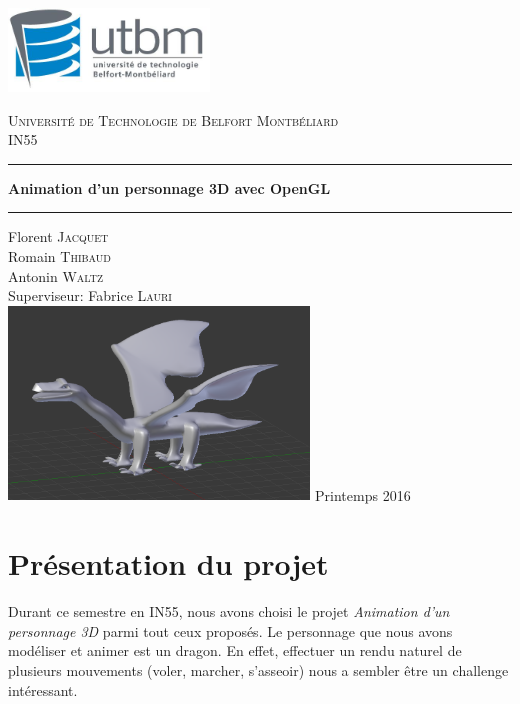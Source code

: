 \documentclass[a4paper]{report}
\begin{document}
\begin{titlepage}
    \includegraphics[width=0.4\textwidth]{logo_utbm.png}
    \begin{center}
        \textsc{\LARGE Université de Technologie de Belfort Montbéliard}\\[1cm]
        \textsc{\Large IN55}\\
        \rule{\linewidth}{0.5mm}
        { \huge \bfseries Animation d'un personnage 3D avec OpenGL\\[0.4cm] }
        \rule{\linewidth}{0.5mm}
        \vskip1cm
        Florent \textsc{Jacquet}\\
	Romain \textsc{Thibaud}\\
        Antonin \textsc{Waltz}\\
        Superviseur: Fabrice \textsc{Lauri}\\
        \vskip1cm
        \includegraphics[width=0.6\textwidth]{dragon_front_page.png}
        \vfill
        {\large Printemps 2016}
    \end{center}
\end{titlepage}

\newpage
\tableofcontents
\listoffigures
\newpage
\chapter{Présentation du projet}
\par
Durant ce semestre en IN55, nous avons choisi le projet \textit{Animation d'un personnage 3D} parmi tout ceux proposés. Le personnage que nous avons modéliser et animer est un dragon. En effet, effectuer un rendu naturel de plusieurs mouvements (voler, marcher, s'asseoir) nous a sembler être un challenge intéressant.
\end{document}
